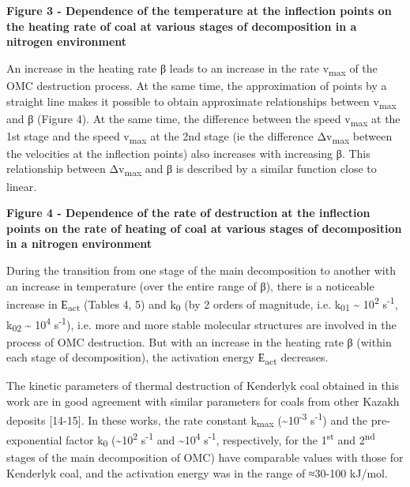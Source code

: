 \textbf{Figure 3 - Dependence of the temperature at the inflection
points on the heating rate of coal at various stages of decomposition in
a nitrogen environment}

An increase in the heating rate β leads to an increase in the rate
v\textsubscript{max} of the OMC destruction process. At the same time,
the approximation of points by a straight line makes it possible to
obtain approximate relationships between v\textsubscript{max} and β
(Figure 4). At the same time, the difference between the speed
v\textsubscript{max} at the 1st stage and the speed v\textsubscript{max}
at the 2nd stage (ie the difference Δv\textsubscript{max} between the
velocities at the inflection points) also increases with increasing β.
This relationship between Δv\textsubscript{max} and β is described by a
similar function close to linear.

\textbf{Figure 4 - Dependence of the rate of destruction at the
inflection points on the rate of heating of coal at various stages of
decomposition in a nitrogen environment}

During the transition from one stage of the main decomposition to
another with an increase in temperature (over the entire range of β),
there is a noticeable increase in Е\textsubscript{act} (Tables 4, 5) and
k\textsubscript{0} (by 2 orders of magnitude, i.e. k\textsubscript{01}
\textasciitilde{} 10\textsuperscript{2} s\textsuperscript{-1},
k\textsubscript{02} \textasciitilde{} 10\textsuperscript{4}
s\textsuperscript{-1}), i.e. more and more stable molecular structures
are involved in the process of OMC destruction. But with an increase in
the heating rate β (within each stage of decomposition), the activation
energy Е\textsubscript{act} decreases.

The kinetic parameters of thermal destruction of Kenderlyk coal obtained
in this work are in good agreement with similar parameters for coals
from other Kazakh deposits {[}14-15{]}. In these works, the rate
constant k\textsubscript{max} (\textasciitilde10\textsuperscript{-3}
s\textsuperscript{-1}) and the pre-exponential factor k\textsubscript{0}
(\textasciitilde10\textsuperscript{2} s\textsuperscript{-1} and
\textasciitilde10\textsuperscript{4} s\textsuperscript{-1},
respectively, for the 1\textsuperscript{st} and 2\textsuperscript{nd}
stages of the main decomposition of OMC) have comparable values with
those for Kenderlyk coal, and the activation energy was in the range of
≈30-100 kJ/mol.


